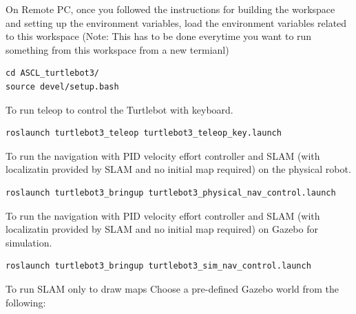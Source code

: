 \documentclass[12]{article}
\begin{document}
On Remote PC, once you followed the instructions for building the workspace and setting up the environment variables,  
load the environment variables related to this workspace (Note: This has to be done everytime you want to run something from this workspace from a new termianl)
\begin{lstlisting}[style=bash]
cd ASCL_turtlebot3/
source devel/setup.bash
\end{lstlisting}

To run teleop to control the Turtlebot with keyboard.
\begin{lstlisting}[style=bash]
roslaunch turtlebot3_teleop turtlebot3_teleop_key.launch
\end{lstlisting}

To run the navigation with PID velocity effort controller and SLAM (with localizatin provided by SLAM and no initial map required) on the physical robot. 
\begin{lstlisting}[style=bash]
roslaunch turtlebot3_bringup turtlebot3_physical_nav_control.launch 
\end{lstlisting}

To run the navigation with PID velocity effort controller and SLAM (with localizatin provided by SLAM and no initial map required) on Gazebo for simulation.  
\begin{lstlisting}[style=bash]
roslaunch turtlebot3_bringup turtlebot3_sim_nav_control.launch 
\end{lstlisting}

To run SLAM only to draw maps
Choose a pre-defined Gazebo world from the following:
\end{document}
